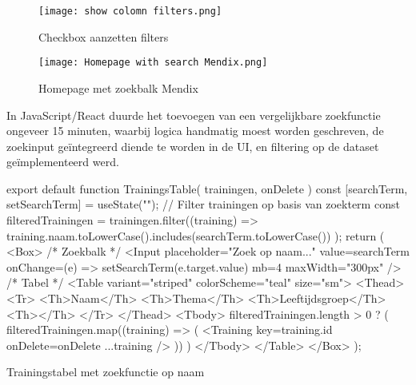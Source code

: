 \begin{figure}[H]
    \centering
    \captionsetup{justification=centering}
    \texttt{[image: show colomn filters.png]}
    \caption[\centering Checkbox aanzetten filters]{\label{fig:show-colomn-filters-Mendix} Checkbox aanzetten filters}
\end{figure}


\begin{figure}[H]
    \centering
    \captionsetup{justification=centering}
    \texttt{[image: Homepage with search Mendix.png]}
    \caption[\centering Homepage with search bar]{\label{fig:homepage-with-search-Mendix} Homepage met zoekbalk Mendix}
\end{figure}



In JavaScript/React duurde het toevoegen van een vergelijkbare zoekfunctie ongeveer 15 minuten, waarbij logica handmatig moest worden geschreven, de zoekinput geïntegreerd diende te worden in de UI, en filtering op de dataset geïmplementeerd werd.

\begin{listing}[H]
        export default function TrainingsTable({ trainingen, onDelete }) {
            const [searchTerm, setSearchTerm] = useState("");
            // Filter trainingen op basis van zoekterm
            const filteredTrainingen = trainingen.filter((training) =>
            training.naam.toLowerCase().includes(searchTerm.toLowerCase())
            );
            return (
            <Box>
            {/* Zoekbalk */}
                <Input
                placeholder="Zoek op naam..."
                value={searchTerm}
                onChange={(e) => setSearchTerm(e.target.value)}
                mb={4}
                maxWidth="300px"
                />
            {/* Tabel */}
                <Table variant="striped" colorScheme="teal" size="sm">
                    <Thead>
                        <Tr>
                            <Th>Naam</Th>
                            <Th>Thema</Th>
                            <Th>Leeftijdsgroep</Th>
                            <Th></Th>
                        </Tr>
                    </Thead>
                    <Tbody>
                        {filteredTrainingen.length > 0 ? (
                         filteredTrainingen.map((training) => (
                            <Training key={training.id} onDelete={onDelete} {...training} />
                            ))
                        )}
                    </Tbody>
                </Table>
            </Box>
            );
        }   
    \captionsetup{justification=centering}
    \caption{Trainingstabel met zoekfunctie op naam}
    \label{lst:pipeline-clone}
\end{listing}

